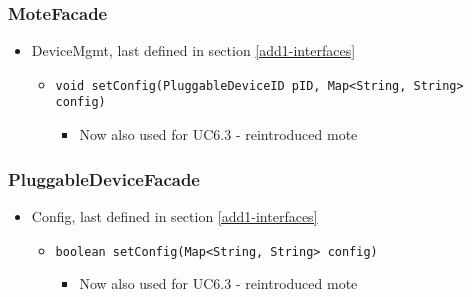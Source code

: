 {{{    \subsubsection{MoteFacade}
        \begin{itemize}
            \item DeviceMgmt, last defined in section \ref{add1-interfaces}
            \begin{itemize}
                \item \texttt{void setConfig(PluggableDeviceID pID, Map<String, String> config)}
                \begin{itemize}
                    \item Now also used for UC6.3 - reintroduced mote
                \end{itemize}
            \end{itemize}
        \end{itemize}

    \subsubsection{PluggableDeviceFacade}
        \begin{itemize}
        	\item Config, last defined in section \ref{add1-interfaces}
        	\begin{itemize}
                \item \texttt{boolean setConfig(Map<String, String> config)}
                    \begin{itemize}
                        \item Now also used for UC6.3 - reintroduced mote
                    \end{itemize}
            \end{itemize}
        \end{itemize}

}}}
